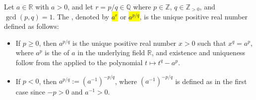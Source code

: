 \begin{definition} \label{definition:rational_exponentiation_of_positive_reals}
    Let $a \in \mathbb{R}$ with $a > 0$, and let $r = p/q \in \mathbb{Q}$ where $p \in \mathbb{Z}$, $q \in \mathbb{Z}_{> 0}$, and $\gcd(p,q) = 1$. The , denoted by \hl{$a^r$} or \hl{$a^{p/q}$}, is the unique positive real number defined as follows:
    \begin{itemize}
        \item If $p \geq 0$, then $a^{p/q}$ is the unique positive real number $x > 0$ such that $x^q = a^p$, where $a^p$ is the  of $a$ in the underlying field $\mathbb{R}$, and existence and uniqueness follow from the  applied to the polynomial $t \mapsto t^q - a^p$.
        \item If $p < 0$, then $a^{p/q} := (a^{-1})^{-p/q}$, where $(a^{-1})^{-p/q}$ is defined as in the first case since $-p > 0$ and $a^{-1} > 0$.
    \end{itemize}
\end{definition}
